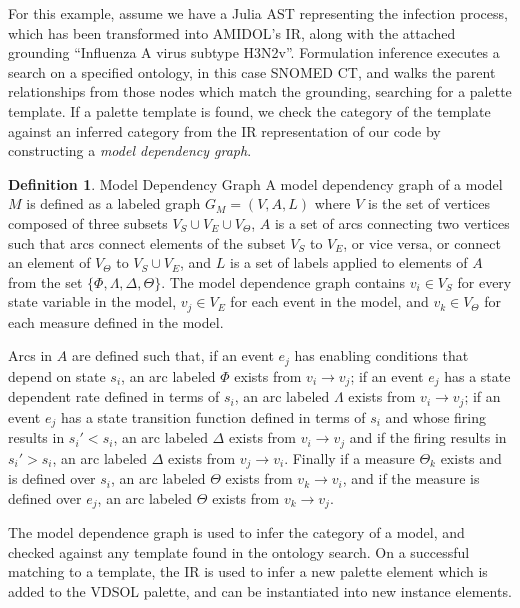 \documentclass[11pt]{article}
\theoremstyle{definition}
\newtheorem{definition}{Definition}[section]
\newcommand{\amidol}{\textsc{AMIDOL}}
\begin{document}
For this example, assume we have a Julia AST representing the
infection process, which has been transformed into \amidol{}'s IR,
along with the attached grounding ``Influenza A virus subtype
H3N2v''.  Formulation inference executes a search on a specified
ontology, in this case SNOMED CT, and walks the parent relationships
from those nodes which match the grounding, searching for a palette
template.  If a palette template is found, we check the category of
the template against an inferred category from the IR representation
of our code by constructing a \emph{model dependency graph}.

\begin{definition}{Model Dependency Graph}
  A model dependency graph of a model $M$ is defined as a labeled
  graph $G_M = (V,A,L)$ where $V$ is the set of vertices composed of
  three subsets $V_S \cup V_E \cup V_{\Theta}$, $A$ is a set of arcs
  connecting two vertices such that arcs connect elements of the
  subset $V_S$ to $V_E$, or vice versa, or connect an element of
  $V_{\Theta}$ to $V_S \cup V_E$, and $L$ is a set of labels applied
  to elements of $A$ from the set $\{\Phi, \Lambda, \Delta,
  \Theta\}$.  The model dependence graph contains $v_i \in V_S$ for
  every state variable in the model, $v_j \in V_E$ for each event
  in the model, and $v_k \in V_{\Theta}$ for each measure defined in
  the model.

  Arcs in $A$ are defined such that, if an event $e_j$ has enabling
  conditions that depend on state $s_i$, an arc labeled $\Phi$ exists
  from $v_i \rightarrow v_j$; if an event $e_j$ has a state dependent
  rate defined in terms of $s_i$, an arc labeled $\Lambda$ exists
  from $v_i \rightarrow v_j$; if an event $e_j$ has a state transition
  function defined in terms of $s_i$ and whose firing results in $s_i'
  < s_i$, an arc labeled $\Delta$ exists from $v_i \rightarrow v_j$
  and if the firing results in $s_i' > s_i$, an arc labeled $\Delta$
  exists from $v_j \rightarrow v_i$.  Finally if a measure $\Theta_k$
  exists and is defined over $s_i$, an arc labeled $\Theta$ exists
  from $v_k \rightarrow v_i$, and if the measure is defined over
  $e_j$, an arc labeled $\Theta$ exists
  from $v_k \rightarrow v_j$.
\end{definition}

The model dependence graph is used to infer the category of a model,
and checked against any template found in the ontology search.  On a
successful matching to a template, the IR is used to infer a new
palette element which is added to the VDSOL palette, and can be
instantiated into new instance elements.
\end{document}
